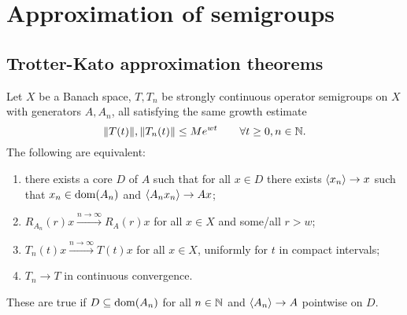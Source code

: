 \section{Approximation of semigroups}
\subsection{Trotter-Kato approximation theorems}
\begin{theorem}
Let $X$ be a Banach space, $T, T_n$ be strongly continuous operator semigroups on $X$ with generators $A, A_n$, all satisfying the same growth estimate
\[ \lVert T(t)\rVert, \lVert T_n(t)\rVert \leq Me^{wt} \qquad \forall t\geq 0, n\in \mathbb{N}. \]
The following are equivalent:
\begin{enumerate}
\item there exists a core $D$ of $A$ such that for all $x\in D$ there exists $\left\langle x_n \right\rangle \to x$ such that $x_n\in\operatorname{dom}(A_n)$ and $\left\langle A_nx_n \right\rangle\to Ax$;
\item $R_{A_n}(r)x \overset{n\to\infty}{\longrightarrow} R_{A}(r)x$ for all $x\in X$ and some/all $r>w$;
\item $T_n(t)x\overset{n\to\infty}{\longrightarrow} T(t)x$ for all $x\in X$, uniformly for $t$ in compact intervals;
\item $T_n \to T$ in continuous convergence.
\end{enumerate}
These are true if $D\subseteq \operatorname{dom}(A_n)$ for all $n\in\mathbb{N}$ and $\left\langle A_n \right\rangle\to A$ pointwise on $D$.
\end{theorem}
